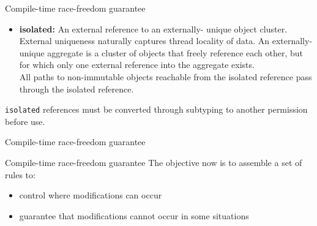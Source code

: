 \documentclass[handout]{beamer} %
\begin{document}
\begin{frame}{Compile-time race-freedom guarantee}
	\newcommand{\bb}{\only<2->{\color{blue}}}
	
	\begin{itemize}
	\item \textbf{isolated:} An external reference to an {\bb externally-
		  unique object cluster}. External uniqueness naturally captures
		  {\bb thread locality of data}. An externally-unique aggregate
		  is a cluster of objects that freely reference each other,
	      but for which {\bb only one external reference into the
	  	  aggregate exists}.\\
	  	  All paths to non-immutable objects reachable from the
	  	  isolated reference pass through the isolated reference.
	\end{itemize}
	\texttt{isolated} references must be converted through
	subtyping to another permission before use.
\end{frame}


\begin{frame}{Compile-time race-freedom guarantee}
	\begin{center}
	\end{center}
\end{frame}


\begin{frame}[fragile]{Compile-time race-freedom guarantee}
	The objective now is to assemble a set of rules to:
	\begin{itemize}
	\item control where modifications can occur
	\item guarantee that modifications cannot occur in some situations
	\end{itemize}
\end{frame}
\end{document}
